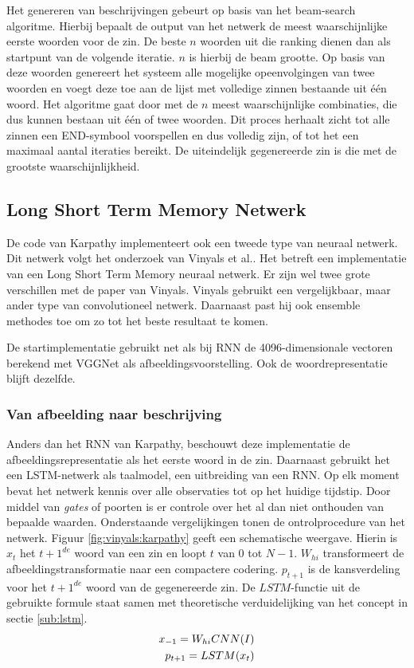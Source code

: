 Het genereren van beschrijvingen gebeurt op basis van het beam-search algoritme. Hierbij bepaalt de output van het netwerk de meest waarschijnlijke eerste woorden voor de zin. De beste $n$ woorden uit die ranking dienen dan als startpunt van de volgende iteratie. $n$ is hierbij de beam grootte. Op basis van deze woorden genereert het systeem alle mogelijke opeenvolgingen van twee woorden en voegt deze toe aan de lijst met volledige zinnen bestaande uit \'e\'en woord. Het algoritme gaat door met de $n$ meest waarschijnlijke combinaties, die dus kunnen bestaan uit \'e\'en of twee woorden. Dit proces herhaalt zicht tot alle zinnen een END-symbool voorspellen en dus volledig zijn, of tot het een maximaal aantal iteraties bereikt. De uiteindelijk gegenereerde zin is die met de grootste waarschijnlijkheid.

\subsection{Long Short Term Memory Netwerk}
\label{sec:lstm}
De code van Karpathy implementeert ook een tweede type van neuraal netwerk. Dit netwerk volgt het onderzoek van Vinyals et al.\cite{Google}. Het betreft een implementatie van een Long Short Term Memory neuraal netwerk. Er zijn wel twee grote verschillen met de paper van Vinyals. Vinyals gebruikt een vergelijkbaar, maar ander type van convolutioneel netwerk. Daarnaast past hij ook ensemble methodes toe om zo tot het beste resultaat te komen.

De startimplementatie gebruikt net als bij RNN de 4096-dimensionale vectoren berekend met VGGNet als afbeeldingsvoorstelling. Ook de woordrepresentatie blijft dezelfde.

\subsubsection{Van afbeelding naar beschrijving}
Anders dan het RNN van Karpathy, beschouwt deze implementatie de afbeeldingsrepresentatie als het eerste woord in de zin. Daarnaast gebruikt het een LSTM-netwerk als taalmodel, een uitbreiding van een RNN. Op elk moment bevat het netwerk kennis over alle observaties tot op het huidige tijdstip. Door middel van \emph{gates} of poorten is er controle over het al dan niet onthouden van bepaalde waarden. Onderstaande vergelijkingen tonen de ontrolprocedure van het netwerk. Figuur \ref{fig:vinyals:karpathy} geeft een schematische weergave. Hierin is $x_t$ het $t+1^{de}$ woord van een zin en loopt $t$ van $0$ tot $N-1$. $W_{hi}$ transformeert de afbeeldingstransformatie naar een compactere codering. $p_{t+1}$ is de kansverdeling voor het $t+1^{de}$ woord van de gegenereerde zin. De $LSTM$-functie uit de gebruikte formule staat samen met theoretische verduidelijking van het concept in sectie \ref{sub:lstm}. 
\begin{eqnarray}
\vspace{-3mm}
x_{-1} = W_{hi}CNN(I)\\
p_{t+1} = LSTM(x_t)
\end{eqnarray}

